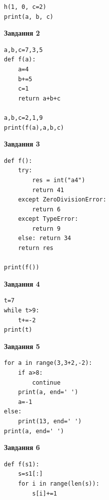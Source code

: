 \documentclass[12pt, ukrainian]{article}
\begin{document}
{{{{{{{{{{{{\begin{minipage}[t]{7.5cm}
\begin{verbatim}
h(1, 0, c=2)
print(a, b, c)
\end{verbatim}



\begin{center}
\textbf{Завдання 2}
\end{center}

\begin{verbatim}
a,b,c=7,3,5
def f(a):
    a=4
    b+=5
    c=1
    return a+b+c

a,b,c=2,1,9
print(f(a),a,b,c)
\end{verbatim}



\begin{center}
\textbf{Завдання 3}
\end{center}

\begin{verbatim}
def f():
    try:
        res = int("a4")
        return 41
    except ZeroDivisionError: 
        return 6
    except TypeError: 
        return 9
    else: return 34
    return res

print(f())
\end{verbatim}



\begin{center}
\textbf{Завдання 4}
\end{center}

\begin{verbatim}
t=7
while t>9:
    t+=-2
print(t)
\end{verbatim}

\end{minipage}
\vline \hspace{6mm}
\begin{minipage}[t]{10.5cm}

\begin{center}
\textbf{Завдання 5}
\end{center}

\begin{verbatim}
for a in range(3,3+2,-2):
    if a>8:
        continue
    print(a, end=' ')
    a=-1
else:
    print(13, end=' ')
print(a, end=' ')
\end{verbatim}



\begin{center}
\textbf{Завдання 6}
\end{center}

\begin{verbatim}
def f(s1):
    s=s1[:]
    for i in range(len(s)):
        s[i]+=1


\end{verbatim}
\end{minipage}}}}}}}}}}}}}
\end{document}
